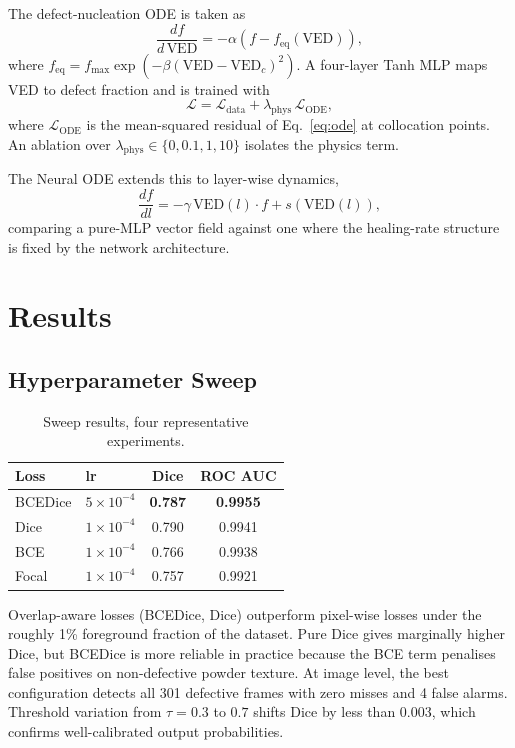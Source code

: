 \documentclass[10pt,twocolumn]{article}
\begin{document}
The defect-nucleation ODE is taken as
\begin{equation}
  \frac{df}{d\,\text{VED}} = -\alpha(f - f_{\text{eq}}(\text{VED})),
  \label{eq:ode}
\end{equation}
where $f_{\text{eq}} = f_{\max}\exp(-\beta(\text{VED}-\text{VED}_c)^2)$.
A four-layer Tanh MLP maps VED to defect fraction and is trained with
\begin{equation}
  \mathcal{L} = \mathcal{L}_{\text{data}}
  + \lambda_{\text{phys}}\,\mathcal{L}_{\text{ODE}},
\end{equation}
where $\mathcal{L}_{\text{ODE}}$ is the mean-squared residual of
Eq.~\eqref{eq:ode} at collocation points. An ablation over
$\lambda_{\text{phys}}\in\{0,0.1,1,10\}$ isolates the physics term.

The Neural ODE extends this to layer-wise dynamics,
\begin{equation}
  \frac{df}{dl} = -\gamma\,\text{VED}(l)\cdot f + s(\text{VED}(l)),
\end{equation}
comparing a pure-MLP vector field against one where the healing-rate
structure is fixed by the network architecture.

\section{Results}

\subsection{Hyperparameter Sweep}

\begin{table}[h]
\centering
\caption{Sweep results, four representative experiments.}
\label{tab:sweep}
\small
\setlength{\tabcolsep}{4pt}
\begin{tabular}{llcc}
\toprule
Loss & lr & Dice & ROC AUC \\
\midrule
BCEDice & $5\times10^{-4}$ & \textbf{0.787} & \textbf{0.9955} \\
Dice    & $1\times10^{-4}$ & 0.790          & 0.9941 \\
BCE     & $1\times10^{-4}$ & 0.766          & 0.9938 \\
Focal   & $1\times10^{-4}$ & 0.757          & 0.9921 \\
\bottomrule
\end{tabular}
\end{table}

Overlap-aware losses (BCEDice, Dice) outperform pixel-wise losses
under the roughly 1\% foreground fraction of the dataset. Pure Dice
gives marginally higher Dice, but BCEDice is more reliable in
practice because the BCE term penalises false positives on
non-defective powder texture. At image level, the best configuration
detects all 301 defective frames with zero misses and 4 false alarms.
Threshold variation from $\tau=0.3$ to $0.7$ shifts Dice by less
than 0.003, which confirms well-calibrated output probabilities.
\end{document}
